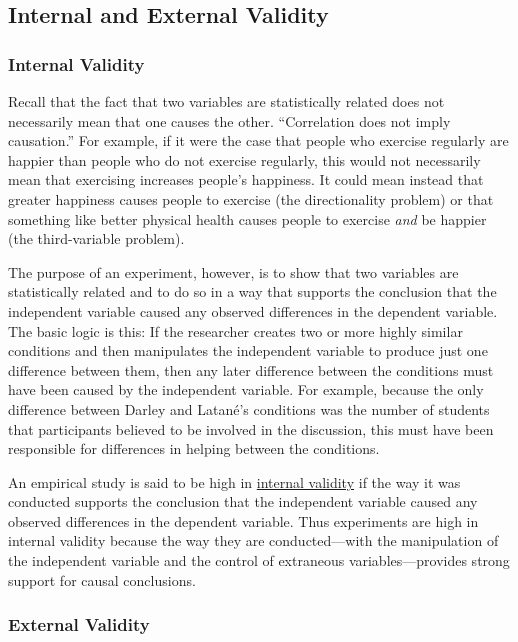 \documentclass[
]{krantz}
\begin{document}
\hypertarget{internal-and-external-validity}{%
\subsection*{Internal and External Validity}\label{internal-and-external-validity}}


\hypertarget{internal-validity}{%
\subsubsection*{Internal Validity}\label{internal-validity}}


Recall that the fact that two variables are statistically related does not necessarily mean that one causes the other. ``Correlation does not imply causation.'' For example, if it were the case that people who exercise regularly are happier than people who do not exercise regularly, this would not necessarily mean that exercising increases people's happiness. It could mean instead that greater happiness causes people to exercise (the directionality problem) or that something like better physical health causes people to exercise \emph{and} be happier (the third-variable problem).

The purpose of an experiment, however, is to show that two variables are statistically related and to do so in a way that supports the conclusion that the independent variable caused any observed differences in the dependent variable. The basic logic is this: If the researcher creates two or more highly similar conditions and then manipulates the independent variable to produce just one difference between them, then any later difference between the conditions must have been caused by the independent variable. For example, because the only difference between Darley and Latané's conditions was the number of students that participants believed to be involved in the discussion, this must have been responsible for differences in helping between the conditions.

An empirical study is said to be high in \protect\hyperlink{internal-validity-1}{internal validity} if the way it was conducted supports the conclusion that the independent variable caused any observed differences in the dependent variable. Thus experiments are high in internal validity because the way they are conducted---with the manipulation of the independent variable and the control of extraneous variables---provides strong support for causal conclusions.

\hypertarget{external-validity}{%
\subsubsection*{External Validity}\label{external-validity}}
\end{document}
